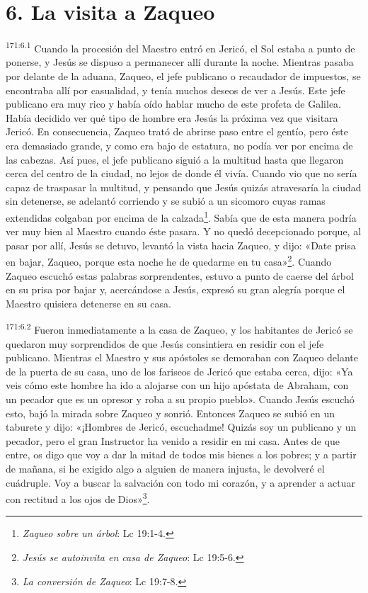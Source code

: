 \section*{6. La visita a Zaqueo}
\par
\textsuperscript{171:6.1} Cuando la procesión del Maestro entró en Jericó, el Sol estaba a punto de ponerse, y Jesús se dispuso a permanecer allí durante la noche. Mientras pasaba por delante de la aduana, Zaqueo, el jefe publicano o recaudador de impuestos, se encontraba allí por casualidad, y tenía muchos deseos de ver a Jesús. Este jefe publicano era muy rico y había oído hablar mucho de este profeta de Galilea. Había decidido ver qué tipo de hombre era Jesús la próxima vez que visitara Jericó. En consecuencia, Zaqueo trató de abrirse paso entre el gentío, pero éste era demasiado grande, y como era bajo de estatura, no podía ver por encima de las cabezas. Así pues, el jefe publicano siguió a la multitud hasta que llegaron cerca del centro de la ciudad, no lejos de donde él vivía. Cuando vio que no sería capaz de traspasar la multitud, y pensando que Jesús quizás atravesaría la ciudad sin detenerse, se adelantó corriendo y se subió a un sicomoro cuyas ramas extendidas colgaban por encima de la calzada\footnote{\textit{Zaqueo sobre un árbol}: Lc 19:1-4.}. Sabía que de esta manera podría ver muy bien al Maestro cuando éste pasara. Y no quedó decepcionado porque, al pasar por allí, Jesús se detuvo, levantó la vista hacia Zaqueo, y dijo: «Date prisa en bajar, Zaqueo, porque esta noche he de quedarme en tu casa»\footnote{\textit{Jesús se autoinvita en casa de Zaqueo}: Lc 19:5-6.}. Cuando Zaqueo escuchó estas palabras sorprendentes, estuvo a punto de caerse del árbol en su prisa por bajar y, acercándose a Jesús, expresó su gran alegría porque el Maestro quisiera detenerse en su casa.

\par
\textsuperscript{171:6.2} Fueron inmediatamente a la casa de Zaqueo, y los habitantes de Jericó se quedaron muy sorprendidos de que Jesús consintiera en residir con el jefe publicano. Mientras el Maestro y sus apóstoles se demoraban con Zaqueo delante de la puerta de su casa, uno de los fariseos de Jericó que estaba cerca, dijo: «Ya veis cómo este hombre ha ido a alojarse con un hijo apóstata de Abraham, con un pecador que es un opresor y roba a su propio pueblo». Cuando Jesús escuchó esto, bajó la mirada sobre Zaqueo y sonrió. Entonces Zaqueo se subió en un taburete y dijo: «¡Hombres de Jericó, escuchadme! Quizás soy un publicano y un pecador, pero el gran Instructor ha venido a residir en mi casa. Antes de que entre, os digo que voy a dar la mitad de todos mis bienes a los pobres; y a partir de mañana, si he exigido algo a alguien de manera injusta, le devolveré el cuádruple. Voy a buscar la salvación con todo mi corazón, y a aprender a actuar con rectitud a los ojos de Dios»\footnote{\textit{La conversión de Zaqueo}: Lc 19:7-8.}.

